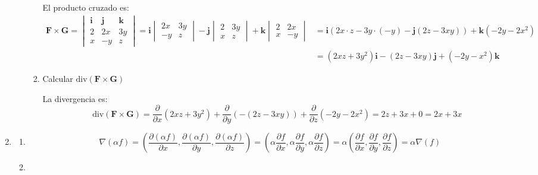 \begin{enumerate}[label=\color{red}\textbf{\arabic*)}]
\begin{enumerate}[label=\color{red}\textbf{\alph*)}]
\begin{enumerate}[label=Paso \arabic*:]
          El producto cruzado es: \[
          \begin{aligned}
          \mathbf{F} \times \mathbf{G} =\begin{vmatrix} 
            \mathbf{i}  & \mathbf{j} &\mathbf{k} \\
            2 & 2x & 3y\\
            x & -y & z
          \end{vmatrix}=\mathbf{i} \begin{vmatrix} 
            2x & 3y\\
            -y & z
          \end{vmatrix} -\mathbf{j} \begin{vmatrix} 
            2 & 3y\\
            x & z
          \end{vmatrix}  +\mathbf{k} \begin{vmatrix} 
            2 & 2x\\
            x & -y
          \end{vmatrix} &=\mathbf{i} (2x\cdot z-3y\cdot (-y)-\mathbf{j} (2z-3xy))+\mathbf{k} (-2y-2x^2)\\
          &=(2xz+3y^2)\mathbf{i} -(2z-3xy)\mathbf{j} +(-2y-x^2)\mathbf{k}
          \end{aligned}
          \] 
        \item Calcular $\mathrm{div} (\mathbf{F} \times \mathbf{G} )$

          La divergencia es:
          \[
          \mathrm{div} (\mathbf{F} \times \mathbf{G} )=\frac{\partial }{\partial x} (2xz+3y^2)+\frac{\partial }{\partial y} (-(2z-3xy))+\frac{\partial }{\partial z} (-2y-2x^2)=2z+3x+0=2x+3x
          \] 
      \end{enumerate}
  \end{enumerate}

\item {} 
  \begin{enumerate}[label=\color{red}\textbf{\alph*)}]
    \item {} 

      \[
        \nabla (\alpha f)=\left( \frac{\partial (\alpha f)}{\partial x} ,\frac{\partial (\alpha f)}{\partial y},\frac{\partial (\alpha f)}{\partial z}   \right) =\left(\alpha \frac{\partial f}{\partial x} ,\alpha \frac{\partial f}{\partial y} ,\alpha \frac{\partial f}{\partial z}\right)=\alpha \left( \frac{\partial f}{\partial x} ,\frac{\partial f}{\partial y} ,\frac{\partial f}{\partial z}  \right) =\alpha \nabla (f)
      \] 
    \item {} 


\end{enumerate}
\end{enumerate}
